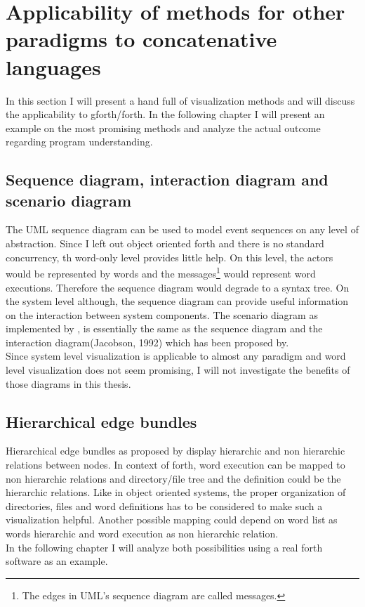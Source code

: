 \section{Applicability of methods for other paradigms to concatenative languages}

In this section I will present a hand full of visualization methods and will discuss the applicability to gforth/forth. In the following chapter I will present an example on the most promising methods and analyze the actual outcome regarding program understanding. 

\subsection*{Sequence diagram, interaction diagram and scenario diagram}

The \gls{UML} sequence diagram can be used to model event sequences on any level of abstraction. Since I left out object oriented forth and there is no standard concurrency, th word-only level provides little help. On this level, the actors would be represented by words and the messages\footnote{The edges in UML's sequence diagram are called messages.} would represent word executions. Therefore the sequence diagram would degrade to a syntax tree. On the system level although, the sequence diagram can provide useful information on the interaction between system components. The scenario diagram as implemented by \cite{Koskimies:1996:SUS:871313}, is essentially the same as the sequence diagram and the interaction diagram(Jacobson, 1992) which has been proposed by.
\\
Since system level visualization is applicable to almost any paradigm and word level visualization does not seem promising, I will not investigate the benefits of those diagrams in this thesis.

\subsection*{Hierarchical edge bundles}
Hierarchical edge bundles as proposed by \cite{Holten:2006:HEB:1187627.1187772} display hierarchic and non hierarchic relations between nodes. In context of forth, word execution can be mapped to non hierarchic relations and directory/file tree and the definition could be the hierarchic relations. Like in object oriented systems, the proper organization of directories, files and word definitions has to be considered to make such a visualization helpful.
Another possible mapping could depend on word list as words hierarchic and word execution as non hierarchic relation.
\\
In the following chapter I will analyze both possibilities using a real forth software as an example.

